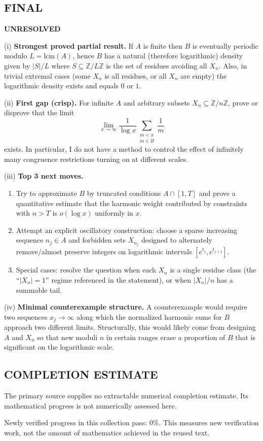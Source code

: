 \subsection*{FINAL}
\textbf{UNRESOLVED}

(i) \textbf{Strongest proved partial result.} If $A$ is finite then $B$ is eventually periodic modulo $L=\mathrm{lcm}(A)$, hence $B$ has a natural (therefore logarithmic) density given by $|S|/L$ where $S\subseteq\mathbb{Z}/L\mathbb{Z}$ is the set of residues avoiding all $X_n$.
Also, in trivial extremal cases (some $X_n$ is all residues, or all $X_n$ are empty) the logarithmic density exists and equals $0$ or $1$.

(ii) \textbf{First gap (crisp).} For infinite $A$ and arbitrary subsets $X_n\subseteq\mathbb{Z}/n\mathbb{Z}$, prove or disprove that the limit
\[\lim_{x\to\infty}\frac{1}{\log x}\sum_{\substack{m<x\\m\in B}}\frac1m\]
exists.
In particular, I do not have a method to control the effect of infinitely many congruence restrictions turning on at different scales.

(iii) \textbf{Top 3 next moves.}
\begin{enumerate}
\item Try to approximate $B$ by truncated conditions $A\cap[1,T]$ and prove a quantitative estimate that the harmonic weight contributed by constraints with $n>T$ is $o(\log x)$ uniformly in $x$.
\item Attempt an explicit oscillatory construction: choose a sparse increasing sequence $n_j\in A$ and forbidden sets $X_{n_j}$ designed to alternately remove/almost preserve integers on logarithmic intervals $[e^{t_j},e^{t_{j+1}}]$.
\item Special cases: resolve the question when each $X_n$ is a single residue class (the ``$|X_n|=1$'' regime referenced in the statement), or when $|X_n|/n$ has a summable tail.
\end{enumerate}

(iv) \textbf{Minimal counterexample structure.} A counterexample would require two sequences $x_j\to\infty$ along which the normalized harmonic sums for $B$ approach two different limits. Structurally, this would likely come from designing $A$ and $X_n$ so that new moduli $n$ in certain ranges erase a proportion of $B$ that is significant on the logarithmic scale.

\bigskip



\subsection*{COMPLETION ESTIMATE}
The primary source supplies no extractable numerical completion estimate. Its mathematical progress is not numerically assessed here.

Newly verified progress in this collection pass: $0\%$. This measures new verification work, not the amount of mathematics achieved in the reused text.
